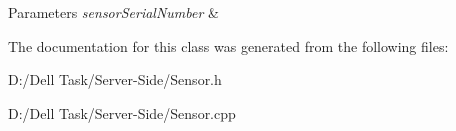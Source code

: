\begin{DoxyParams}{Parameters}
{\em sensor\+Serial\+Number} & \\
\hline
\end{DoxyParams}


The documentation for this class was generated from the following files\+:\begin{DoxyCompactItemize}
\item 
D\+:/\+Dell Task/\+Server-\/\+Side/Sensor.\+h\item 
D\+:/\+Dell Task/\+Server-\/\+Side/Sensor.\+cpp\end{DoxyCompactItemize}
